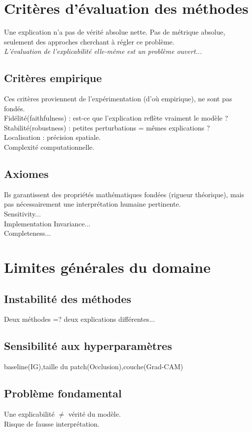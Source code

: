 \documentclass[12pt,a4paper]{article}
\begin{document}
\section*{Critères d'évaluation des méthodes}
Une explication n'a pas de vérité absolue nette. Pas de métrique absolue, seulement des approches cherchant à régler ce problème.\\
\textit{L'évaluation de l'explicabilité elle-même est un problème ouvert...}
\subsection*{Critères empirique}
Ces critères proviennent de l'expérimentation (d'où empirique), ne sont pas fondés.\\
Fidélité(faithfulness) : est-ce que l'explication reflète vraiment le modèle ?\\
Stabilité(robustness) : petites perturbations = mêmes explications ?\\
Localisation : précision spatiale.\\
Complexité computationnelle.

\subsection*{Axiomes}
Ils garantissent des propriétés mathématiques fondées (rigueur théorique), mais pas nécessairement une interprétation humaine pertinente.\\
Sensitivity...\\
Implementation Invariance...\\
Completeness...


\section*{Limites générales du domaine}

\subsection*{Instabilité des méthodes}
Deux méthodes =? deux explications différentes...

\subsection*{Sensibilité aux hyperparamètres}
baseline(IG),taille du patch(Occlusion),couche(Grad-CAM)

\subsection*{Problème fondamental}
Une explicabilité $\neq$ vérité du modèle.\\
Risque de fausse interprétation.
\end{document}

